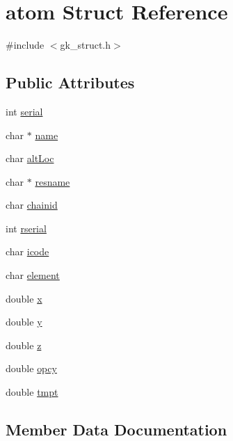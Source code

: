 \hypertarget{structatom}{}\section{atom Struct Reference}
\label{structatom}


{\ttfamily \#include $<$gk\+\_\+struct.\+h$>$}

\subsection*{Public Attributes}
\begin{DoxyCompactItemize}
\item 
int \hyperlink{structatom_ad45e6aafd641f6ed2eb77865f60d90d3}{serial}
\item 
char $\ast$ \hyperlink{structatom_ac64febfef5e9a65be5ced72df2f35f2f}{name}
\item 
char \hyperlink{structatom_a58394b79c284cdfe3c76731fe67a4cd6}{alt\+Loc}
\item 
char $\ast$ \hyperlink{structatom_aefce1d0733ca41ce500827729fde1239}{resname}
\item 
char \hyperlink{structatom_a98bc9c8068bff47590dd812f1ccd5e9a}{chainid}
\item 
int \hyperlink{structatom_aa4e2ac95e55329c8c57bbd218a2c5dda}{rserial}
\item 
char \hyperlink{structatom_aa5fede9d98d26f6eceb26761d583992b}{icode}
\item 
char \hyperlink{structatom_a99f27d9e1ab04633227c9c9586fbc561}{element}
\item 
double \hyperlink{structatom_a3663325df6d9aaebad7d70c3f4a1c546}{x}
\item 
double \hyperlink{structatom_ae0ceb481033f0710f0e2d50c281c0d4e}{y}
\item 
double \hyperlink{structatom_ac42f4b22143f6cda6bd26bfa01896a65}{z}
\item 
double \hyperlink{structatom_a9c8491ea36643ec020390474c292ce33}{opcy}
\item 
double \hyperlink{structatom_a1adb2549c50f0d7ef72b714bbe89726f}{tmpt}
\end{DoxyCompactItemize}


\subsection{Member Data Documentation}
\mbox{\label{structatom_a58394b79c284cdfe3c76731fe67a4cd6}} 
